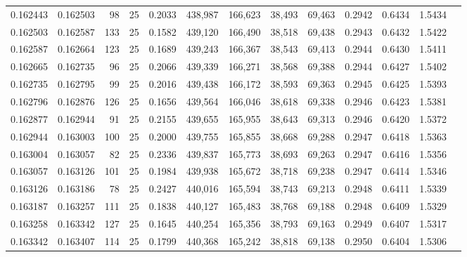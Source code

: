 \begin{tabular}{rrrrrrrrrrrrr}
0.162443 & 0.162503 &    98 &  25 &                                     0.2033 & 438,987 & 166,623 &  38,493 &  69,463 & 0.2942 & 0.6434 & 1.5434 \\
0.162503 & 0.162587 &   133 &  25 &                                     0.1582 & 439,120 & 166,490 &  38,518 &  69,438 & 0.2943 & 0.6432 & 1.5422 \\
0.162587 & 0.162664 &   123 &  25 &                                     0.1689 & 439,243 & 166,367 &  38,543 &  69,413 & 0.2944 & 0.6430 & 1.5411 \\
0.162665 & 0.162735 &    96 &  25 &                                     0.2066 & 439,339 & 166,271 &  38,568 &  69,388 & 0.2944 & 0.6427 & 1.5402 \\
0.162735 & 0.162795 &    99 &  25 &                                     0.2016 & 439,438 & 166,172 &  38,593 &  69,363 & 0.2945 & 0.6425 & 1.5393 \\
0.162796 & 0.162876 &   126 &  25 &                                     0.1656 & 439,564 & 166,046 &  38,618 &  69,338 & 0.2946 & 0.6423 & 1.5381 \\
0.162877 & 0.162944 &    91 &  25 &                                     0.2155 & 439,655 & 165,955 &  38,643 &  69,313 & 0.2946 & 0.6420 & 1.5372 \\
0.162944 & 0.163003 &   100 &  25 &                                     0.2000 & 439,755 & 165,855 &  38,668 &  69,288 & 0.2947 & 0.6418 & 1.5363 \\
0.163004 & 0.163057 &    82 &  25 &                                     0.2336 & 439,837 & 165,773 &  38,693 &  69,263 & 0.2947 & 0.6416 & 1.5356 \\
0.163057 & 0.163126 &   101 &  25 &                                     0.1984 & 439,938 & 165,672 &  38,718 &  69,238 & 0.2947 & 0.6414 & 1.5346 \\
0.163126 & 0.163186 &    78 &  25 &                                     0.2427 & 440,016 & 165,594 &  38,743 &  69,213 & 0.2948 & 0.6411 & 1.5339 \\
0.163187 & 0.163257 &   111 &  25 &                                     0.1838 & 440,127 & 165,483 &  38,768 &  69,188 & 0.2948 & 0.6409 & 1.5329 \\
0.163258 & 0.163342 &   127 &  25 &                                     0.1645 & 440,254 & 165,356 &  38,793 &  69,163 & 0.2949 & 0.6407 & 1.5317 \\
0.163342 & 0.163407 &   114 &  25 &                                     0.1799 & 440,368 & 165,242 &  38,818 &  69,138 & 0.2950 & 0.6404 & 1.5306 \\

\end{tabular}
